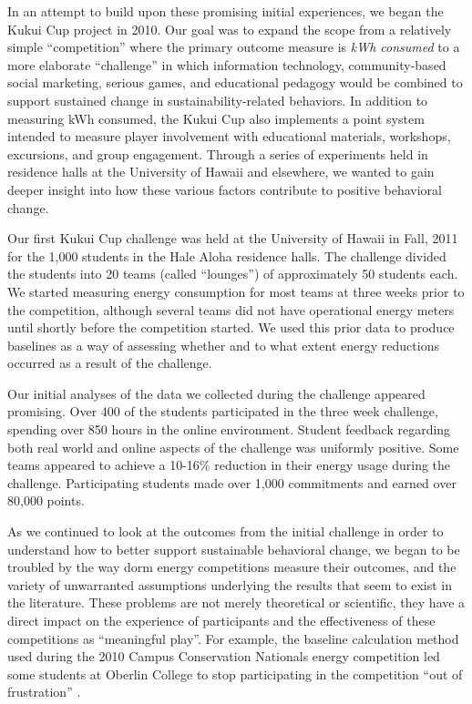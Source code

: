 \documentclass[jou]{apa} %
\begin{document}
In an attempt to build upon these promising initial experiences, we began the Kukui Cup
project in 2010.  Our goal was to expand the scope from a relatively simple
``competition'' where the primary outcome measure is {\em kWh consumed} to a more
elaborate ``challenge'' in which information technology, community-based social marketing,
serious games, and educational pedagogy would be combined to support sustained change in
sustainability-related behaviors.  In addition to measuring kWh consumed, the Kukui Cup
also implements a point system intended to measure player involvement with educational
materials, workshops, excursions, and group engagement.  Through a series of experiments
held in residence halls at the University of Hawaii and elsewhere, we wanted to gain
deeper insight into how these various factors contribute to positive behavioral change.

Our first Kukui Cup challenge was held at the University of Hawaii in Fall, 2011 for the
1,000 students in the Hale Aloha residence halls. The challenge divided the students into
20 teams (called ``lounges'') of approximately 50 students each.  We started measuring
energy consumption for most teams at three weeks prior to the competition, although
several teams did not have operational energy meters until shortly before the competition
started. We used this prior data to produce baselines as a way of assessing whether and to
what extent energy reductions occurred as a result of the challenge.

Our initial analyses of the data we collected during the challenge appeared promising.
Over 400 of the students participated in the three week challenge, spending over 850 hours
in the online environment.  Student feedback regarding both real world and online aspects
of the challenge was uniformly positive.  Some teams appeared to achieve a 10-16\%
reduction in their energy usage during the challenge.  Participating students made over
1,000 commitments and earned over 80,000 points.

As we continued to look at the outcomes from the initial challenge in order to understand
how to better support sustainable behavioral change, we began to be troubled by the way
dorm energy competitions measure their outcomes, and the variety of unwarranted
assumptions underlying the results that seem to exist in the literature.  These problems
are not merely theoretical or scientific, they have a direct impact on the experience of
participants and the effectiveness of these competitions as ``meaningful play''.  For
example, the baseline calculation method used during the 2010 Campus Conservation
Nationals energy competition led some students at Oberlin College to stop participating in
the competition ``out of frustration'' \cite{Willens2010}.
\end{document}
